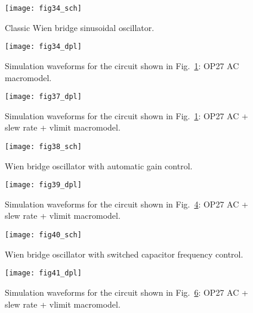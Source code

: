 \begin{figure}
  \centering
  \texttt{[image: fig34\_sch]}
  \caption{Classic Wien bridge sinusoidal oscillator.} 
  \label{fig:opamp35}
\end{figure}

\begin{figure}
  \centering
  \texttt{[image: fig34\_dpl]}
  \caption{Simulation waveforms for the circuit shown in Fig.~\ref{fig:opamp35}: OP27 AC macromodel. } 
  \label{fig:opamp36}
\end{figure}

\begin{figure}
  \centering
  \texttt{[image: fig37\_dpl]}
  \caption{Simulation waveforms for the circuit shown in Fig.~\ref{fig:opamp35}: OP27 AC + slew rate + vlimit macromodel. } 
  \label{fig:opamp37}
\end{figure}

\begin{figure}
  \centering
  \texttt{[image: fig38\_sch]}
  \caption{Wien bridge oscillator with automatic gain control. } 
  \label{fig:opamp38}
\end{figure}

\begin{figure}
  \centering
  \texttt{[image: fig39\_dpl]}
  \caption{Simulation waveforms for the circuit shown in Fig.~\ref{fig:opamp38}: OP27 AC + slew rate + vlimit macromodel. } 
  \label{fig:opamp39}
\end{figure}

\begin{figure}
  \centering
  \texttt{[image: fig40\_sch]}
  \caption{Wien bridge oscillator with switched capacitor frequency control. } 
  \label{fig:opamp40}
\end{figure}

\begin{figure} 
  \centering
  \texttt{[image: fig41\_dpl]}
  \caption{Simulation waveforms for the circuit shown in Fig.~\ref{fig:opamp40}: OP27 AC + slew rate + vlimit macromodel. } 
  \label{fig:opamp41}
\end{figure}

